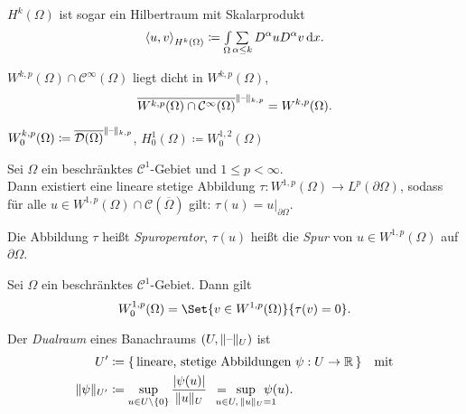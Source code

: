 \documentclass{cheat-sheet}
\newcommand{\Cont}{\mathcal{C}} %
\newcommand{\clos}[1]{\overline{#1}} %
\newcommand{\bOmega}{\partial \Omega} %
\newcommand{\IntOmega}[2]{\AInt{\Omega}{#1}{#2}} %
\newcommand{\scp}[2]{\left\langle #1 , #2 \right\rangle} %
\newcommand{\Testfun}{\mathcal{D}} %
\begin{document}
\begin{bem}
  $H^k(\Omega)$ ist sogar ein Hilbertraum mit Skalarprodukt
  \[
    \scp{u}{v}_{H^k(\Omega)} \coloneqq \IntOmega{\sum_{\alpha \leq k} D^\alpha u D^\alpha v}{x}.
  \]
\end{bem}


\begin{satz}["`$H = W$"'] %
  $W^{k,p}(\Omega) \cap \Cont^\infty(\Omega)$ liegt dicht in $W^{k,p}(\Omega)$, \dh{}
  \[
    \clos{W^{k,p}(\Omega) \cap \Cont^\infty(\Omega)}^{\norm{\blank}_{k,p}} = W^{k,p}(\Omega).
  \]
\end{satz}

\begin{defn}
  $W_0^{k,p}(\Omega) \coloneqq \clos{\Testfun(\Omega)}^{\norm{\blank}_{k,p}}$, \quad
  $H_0^1(\Omega) \coloneqq W^{1,2}_0(\Omega)$
\end{defn}

\begin{satz}
  Sei $\Omega$ ein beschränktes $\Cont^1$-Gebiet und $1 \leq p < \infty$. \\
  Dann existiert eine lineare stetige Abbildung $\tau : W^{1,p}(\Omega) \to L^p(\bOmega)$, sodass für alle $u \in W^{1,p}(\Omega) \cap \Cont(\clos{\Omega})$ gilt: $\tau(u) = u|_{\bOmega}$.
\end{satz}


\begin{defn}
  Die Abbildung $\tau$ heißt \emph{Spuroperator}, $\tau(u)$ heißt die \emph{Spur} von $u \in W^{1,p}(\Omega)$ auf $\bOmega$.
\end{defn}

\begin{satz}
  Sei $\Omega$ ein beschränktes $\Cont^1$-Gebiet.
  Dann gilt
  \[
    W_0^{1,p}(\Omega) = \Set{v \in W^{1,p}(\Omega)}{\tau(v) = 0}.
  \]
\end{satz}



\begin{defn}
  Der \emph{Dualraum} eines Banachraums $(U, \lVert\text{--}\rVert_U)$ ist
  \begin{align*}
    U' & \coloneqq \{\, \text{lineare, stetige Abbildungen } \psi : U \to \R \,\}
    \quad \text{mit} \\
    \norm{\psi}_{U'} & \coloneqq \sup_{u \in U \setminus \{ 0 \}} \frac{\abs{\psi(u)}}{\norm{u}_U}
    \enspace = \enspace \sup_{\mathclap{u \in U, \, \norm{u}_U = 1}} \enspace \psi(u).
  \end{align*}
\end{defn}
\end{document}
